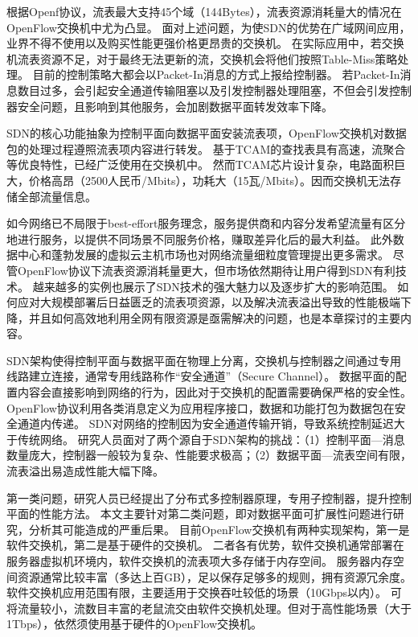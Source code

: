 根据Openf协议，流表最大支持45个域（144Bytes），流表资源消耗量大的情况在OpenFlow交换机中尤为凸显。
面对上述问题，为使SDN的优势在广域网间应用，业界不得不使用以及购买性能更强价格更昂贵的交换机。
在实际应用中，若交换机流表资源不足，对于最终无法更新的流，交换机会将他们按照Table-Miss策略处理。
目前的控制策略大都会以Packet-In消息的方式上报给控制器。
若Packet-In消息数目过多，会引起安全通道传输阻塞以及引发控制器处理阻塞，不但会引发控制器安全问题，且影响到其他服务，会加剧数据平面转发效率下降。


SDN的核心功能抽象为控制平面向数据平面安装流表项，OpenFlow交换机对数据包的处理过程遵照流表项内容进行转发。
基于TCAM的查找表具有高速，流聚合等优良特性，已经广泛使用在交换机中。
然而TCAM芯片设计复杂，电路面积巨大，价格高昂（2500人民币/Mbits），功耗大（15瓦/Mbits）。因而交换机无法存储全部流量信息。

如今网络已不局限于best-effort服务理念，服务提供商和内容分发希望流量有区分地进行服务，以提供不同场景不同服务价格，赚取差异化后的最大利益。
此外数据中心和蓬勃发展的虚拟云主机市场也对网络流量细粒度管理提出更多需求。
尽管OpenFlow协议下流表资源消耗量更大，但市场依然期待让用户得到SDN有利技术。
越来越多的实例也展示了SDN技术的强大魅力以及逐步扩大的影响范围。
如何应对大规模部署后日益匮乏的流表项资源，以及解决流表溢出导致的性能极端下降，并且如何高效地利用全网有限资源是亟需解决的问题，也是本章探讨的主要内容。


\label{chap532}

SDN架构使得控制平面与数据平面在物理上分离，交换机与控制器之间通过专用线路建立连接，通常专用线路称作“安全通道”（Secure Channel）。
数据平面的配置内容会直接影响到网络的行为，因此对于交换机的配置需要确保严格的安全性。
OpenFlow协议利用各类消息定义为应用程序接口，数据和功能打包为数据包在安全通道内传递。
SDN对网络的控制因为安全通道传输开销，导致系统控制延迟大于传统网络。
研究人员面对了两个源自于SDN架构的挑战：（1）控制平面---消息数量庞大，控制器一般较为复杂、性能要求极高；（2）数据平面---流表空间有限，流表溢出易造成性能大幅下降。

第一类问题，研究人员已经提出了分布式多控制器原理，专用子控制器，提升控制平面的性能方法。
本文主要针对第二类问题，即对数据平面可扩展性问题进行研究，分析其可能造成的严重后果。
目前OpenFlow交换机有两种实现架构，第一是软件交换机，第二是基于硬件的交换机。
二者各有优势，软件交换机通常部署在服务器虚拟机环境内，软件交换机的流表项大多存储于内存空间。
服务器内存空间资源通常比较丰富（多达上百GB），足以保存足够多的规则，拥有资源冗余度。
软件交换机应用范围有限，主要适用于交换吞吐较低的场景（10Gbps以内）。
可将流量较小，流数目丰富的老鼠流交由软件交换机处理。但对于高性能场景（大于1Tbps），依然须使用基于硬件的OpenFlow交换机。

